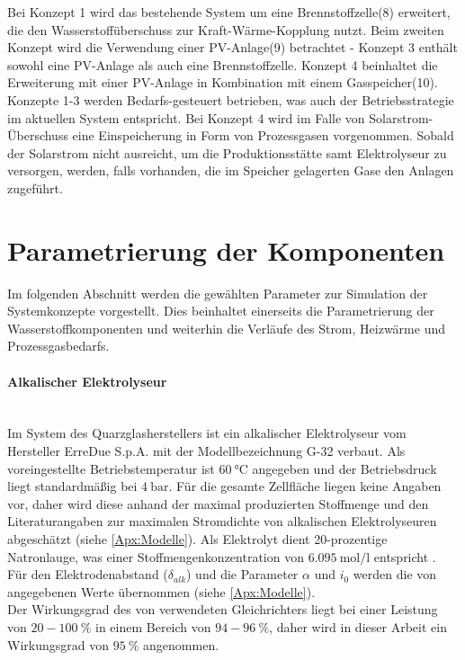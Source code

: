 Bei Konzept 1 wird das bestehende System um eine Brennstoffzelle(8) erweitert, die den Wasserstoffüberschuss zur Kraft-Wärme-Kopplung nutzt. Beim zweiten Konzept wird die Verwendung einer PV-Anlage(9) betrachtet - Konzept 3 enthält sowohl eine PV-Anlage als auch eine Brennstoffzelle. Konzept 4 beinhaltet die Erweiterung mit einer PV-Anlage in Kombination mit einem Gasspeicher(10).\\ 
    
Konzepte 1-3 werden Bedarfs-gesteuert betrieben, was auch der Betriebsstrategie im aktuellen System entspricht. Bei Konzept 4 wird im Falle von Solarstrom-Überschuss eine Einspeicherung in Form von Prozessgasen vorgenommen. Sobald der Solarstrom nicht ausreicht, um die Produktionsstätte samt Elektrolyseur zu versorgen, werden, falls vorhanden, die im Speicher gelagerten Gase den Anlagen zugeführt.

\section{Parametrierung der Komponenten}
Im folgenden Abschnitt werden die gewählten Parameter zur Simulation der Systemkonzepte vorgestellt. Dies beinhaltet einerseits die Parametrierung der Wasserstoffkomponenten und weiterhin die Verläufe des Strom, Heizwärme und Prozessgasbedarfs.

\paragraph{Alkalischer Elektrolyseur}\ \\
Im System des Quarzglasherstellers ist ein alkalischer Elektrolyseur vom Hersteller ErreDue S.p.A. mit der Modellbezeichnung G-32 verbaut. Als voreingestellte Betriebstemperatur ist $\SI{60}{\degreeCelsius}$ angegeben und der Betriebsdruck liegt standardmäßig bei $\SI{4}{\bar}$.
Für die gesamte Zellfläche liegen keine Angaben vor, daher wird diese anhand der maximal produzierten Stoffmenge und den Literaturangaben zur maximalen Stromdichte von alkalischen Elektrolyseuren abgeschätzt (siehe \ref{Apx:Modelle}). Als Elektrolyt dient 20-prozentige Natronlauge, was einer Stoffmengenkonzentration von $\SI{6,095}{\mol\per\l}$ entspricht \citep{periodensystem-online_dichtewerttabelle_nodate-1}.\\
Für den Elektrodenabstand ($\delta_{alk}$) und die Parameter $\alpha$ und $i_0$ werden die von \citet{milewski_modeling_2014} angegebenen Werte übernommen (siehe \ref{Apx:Modelle}).\\ 
Der Wirkungsgrad des von \citet[S.~50]{tjarks_pem-elektrolyse-systeme_2017} verwendeten Gleichrichters liegt bei einer Leistung von $20-\SI{100}{\%}$ in einem Bereich von $94-\SI{96}{\%}$, daher wird in dieser Arbeit ein Wirkungsgrad von $\SI{95}{\%}$ angenommen.

